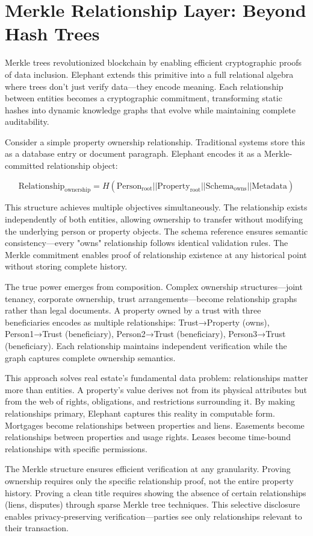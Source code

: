 \section{Merkle Relationship Layer: Beyond Hash Trees}

Merkle trees revolutionized blockchain by enabling efficient cryptographic proofs of data inclusion. Elephant extends this primitive into a full relational algebra where trees don't just verify data—they encode meaning. Each relationship between entities becomes a cryptographic commitment, transforming static hashes into dynamic knowledge graphs that evolve while maintaining complete auditability.

Consider a simple property ownership relationship. Traditional systems store this as a database entry or document paragraph. Elephant encodes it as a Merkle-committed relationship object:

\[
\text{Relationship}_{\text{ownership}} = H(\text{Person}_{\text{root}} || \text{Property}_{\text{root}} || \text{Schema}_{\text{owns}} || \text{Metadata})
\]

This structure achieves multiple objectives simultaneously. The relationship exists independently of both entities, allowing ownership to transfer without modifying the underlying person or property objects. The schema reference ensures semantic consistency—every "owns" relationship follows identical validation rules. The Merkle commitment enables proof of relationship existence at any historical point without storing complete history.

The true power emerges from composition. Complex ownership structures—joint tenancy, corporate ownership, trust arrangements—become relationship graphs rather than legal documents. A property owned by a trust with three beneficiaries encodes as multiple relationships: Trust→Property (owns), Person1→Trust (beneficiary), Person2→Trust (beneficiary), Person3→Trust (beneficiary). Each relationship maintains independent verification while the graph captures complete ownership semantics.

This approach solves real estate's fundamental data problem: relationships matter more than entities. A property's value derives not from its physical attributes but from the web of rights, obligations, and restrictions surrounding it. By making relationships primary, Elephant captures this reality in computable form. Mortgages become relationships between properties and liens. Easements become relationships between properties and usage rights. Leases become time-bound relationships with specific permissions.

The Merkle structure ensures efficient verification at any granularity. Proving ownership requires only the specific relationship proof, not the entire property history. Proving a clean title requires showing the absence of certain relationships (liens, disputes) through sparse Merkle tree techniques. This selective disclosure enables privacy-preserving verification—parties see only relationships relevant to their transaction.

